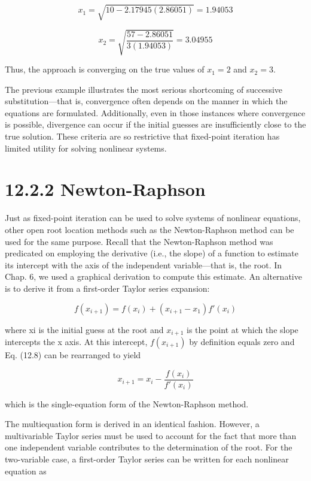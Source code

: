 \documentclass[../main.tex]{subfiles}
\begin{document}
\begin{equation}
x_{1}=\sqrt{10-2.17945(2.86051)}=1.94053
\end{equation}

\begin{equation}
x_{2}=\sqrt{\frac{57-2.86051}{3(1.94053)}}=3.04955
\end{equation}

Thus, the approach is converging on the true values of $x_{1}=2$ and $x_{2}=3$.

The previous example illustrates the most serious shortcoming of successive
substitution—that is, convergence often depends on the manner in which the equations are
formulated. Additionally, even in those instances where convergence is possible, divergence can occur if the initial guesses are insufficiently close to the true solution. These
criteria are so restrictive that fixed-point iteration has limited utility for solving nonlinear
systems.


\section*{12.2.2 Newton-Raphson}

Just as fixed-point iteration can be used to solve systems of nonlinear equations, other open
root location methods such as the Newton-Raphson method can be used for the same purpose. Recall that the Newton-Raphson method was predicated on employing the derivative
(i.e., the slope) of a function to estimate its intercept with the axis of the independent
variable—that is, the root. In Chap. 6, we used a graphical derivation to compute this estimate. An alternative is to derive it from a first-order Taylor series expansion:

\begin{equation}
f(x_{i+1})=f(x_{i})+(x_{i+1}-x_{1})f'(x_{i})
\tag{12.8}
\end{equation}

where xi is the initial guess at the root and $x_{i+1}$ is the point at which the slope intercepts the x axis.
At this intercept, $f(x_{i+1})$ by definition equals zero and Eq. (12.8) can be rearranged to yield

\begin{equation}
x_{i+1}=x_{i}-\frac{f(x_{i})}{f'(x_{i})}
\tag{12.9}
\end{equation}

which is the single-equation form of the Newton-Raphson method.

The multiequation form is derived in an identical fashion. However, a multivariable
Taylor series must be used to account for the fact that more than one independent variable
contributes to the determination of the root. For the two-variable case, a first-order Taylor
series can be written for each nonlinear equation as
\end{document}
